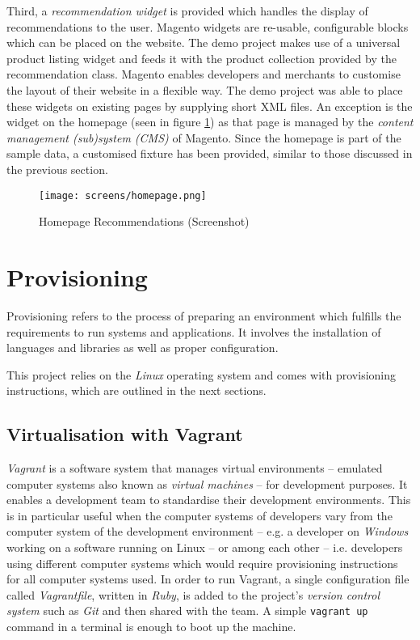 Third, a \emph{recommendation widget} is provided which handles the display of recommendations to the user. Magento widgets are re-usable, configurable blocks which can be placed on the website. The demo project makes use of a universal product listing widget and feeds it with the product collection provided by the recommendation class. Magento enables developers and merchants to customise the layout of their website in a flexible way. The demo project was able to place these widgets on existing pages by supplying short XML files. An exception is the widget on the homepage (seen in figure \ref{fig:implementation-magento-homepage}) as that page is managed by the \emph{content management (sub)system (CMS)} of Magento. Since the homepage is part of the sample data, a customised fixture has been provided, similar to those discussed in the previous section.

\begin{figure}[!ht]
    \texttt{[image: screens/homepage.png]}
    \caption{Homepage Recommendations (Screenshot)}
    \label{fig:implementation-magento-homepage}
\end{figure}

\section{Provisioning}

Provisioning refers to the process of preparing an environment which fulfills the requirements to run systems and applications. It involves the installation of languages and libraries as well as proper configuration.

This project relies on the \emph{Linux} operating system and comes with provisioning instructions, which are outlined in the next sections.

\subsection{Virtualisation with Vagrant}

\emph{Vagrant} is a software system that manages virtual environments -- emulated computer systems also known as \emph{virtual machines} -- for development purposes. It enables a development team to standardise their development environments. This is in particular useful when the computer systems of developers vary from the computer system of the development environment -- e.g. a developer on \emph{Windows} working on a software running on Linux -- or among each other -- i.e. developers using different computer systems which would require provisioning instructions for all computer systems used. In order to run Vagrant, a single configuration file called \emph{Vagrantfile}, written in \emph{Ruby}, is added to the project's \emph{version control system} such as \emph{Git} and then shared with the team. A simple \texttt{vagrant up} command in a terminal is enough to boot up the machine.

